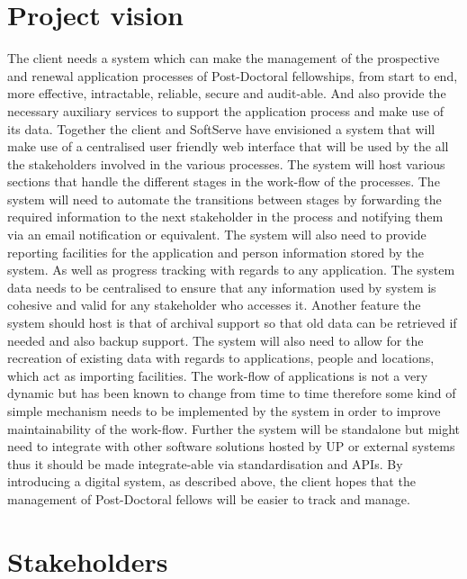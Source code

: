 \documentclass[12pt]{article}
\begin{document}
\section{Project vision}
\vspace{0.2in}
The client needs a system which can make the management of the prospective and renewal application processes of Post-Doctoral fellowships, from start to end, more effective, intractable, reliable, secure and audit-able. And also provide the necessary auxiliary services to support the application process and make use of its data. Together the client and SoftServe have envisioned a system that will make use of a centralised user friendly web interface that will be used by the all the stakeholders involved in the various processes. The system will host various sections that handle the different stages in the work-flow of the processes. The system will need to automate the transitions between stages by forwarding the required information to the next stakeholder in the process and notifying them via an email notification or equivalent. The system will also need to provide reporting facilities for the application and person information stored by the system. As well as progress tracking with regards to any application. The system data needs to be centralised to ensure that any information used by system is cohesive and valid for any stakeholder who accesses it. Another feature the system should host is that of archival support so that old data can be retrieved if needed and also backup support. The system will also need to allow for the recreation of existing data with regards to applications, people and locations, which act as importing facilities. The work-flow of applications is not a very dynamic but has been known to change from time to time therefore some kind of simple mechanism needs to be implemented by the system in order to improve maintainability of the work-flow. Further the system will be standalone but might need to integrate with other software solutions hosted by UP or external systems thus it should be made integrate-able via standardisation and APIs. By introducing a digital system, as described above, the client hopes that the management of Post-Doctoral fellows will be easier to track and manage.
\vspace{0.5in}

\newpage
\section{Stakeholders}
\end{document}
